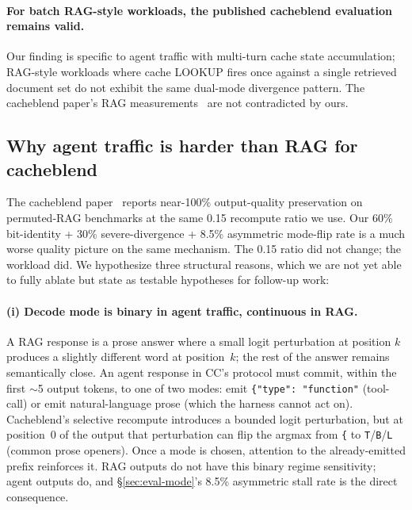 \paragraph{For batch RAG-style workloads, the published cacheblend
evaluation remains valid.} Our finding is specific to agent traffic
with multi-turn cache state accumulation; RAG-style workloads where
cache LOOKUP fires once against a single retrieved document set do not
exhibit the same dual-mode divergence pattern. The cacheblend paper's
RAG measurements~\cite{lmcache-cacheblend} are not contradicted by ours.

\subsection{Why agent traffic is harder than RAG for cacheblend}
\label{sec:disc-why-agents}

The cacheblend paper~\cite{lmcache-cacheblend} reports near-100\%
output-quality preservation on permuted-RAG benchmarks at the same
0.15 recompute ratio we use. Our 60\% bit-identity + 30\%
severe-divergence + 8.5\% asymmetric mode-flip rate is a much worse
quality picture on the same mechanism. The 0.15 ratio did not
change; the workload did. We hypothesize three structural reasons,
which we are not yet able to fully ablate but state as testable
hypotheses for follow-up work:

\paragraph{(i) Decode mode is binary in agent traffic, continuous in
RAG.} A RAG response is a prose answer where a small logit
perturbation at position $k$ produces a slightly different word at
position~$k$; the rest of the answer remains semantically close. An
agent response in CC's protocol must commit, within the first $\sim$5
output tokens, to one of two modes: emit \texttt{\{"type":~"function"}
(tool-call) or emit natural-language prose (which the harness cannot
act on). Cacheblend's selective recompute introduces a bounded
logit perturbation, but at position~0 of the output that perturbation
can flip the argmax from \texttt{\{} to \texttt{T}/\texttt{B}/\texttt{L}
(common prose openers). Once a mode is chosen, attention to the
already-emitted prefix reinforces it. RAG outputs do not have this
binary regime sensitivity; agent outputs do, and
\S\ref{sec:eval-mode}'s 8.5\% asymmetric stall rate is the direct
consequence.

